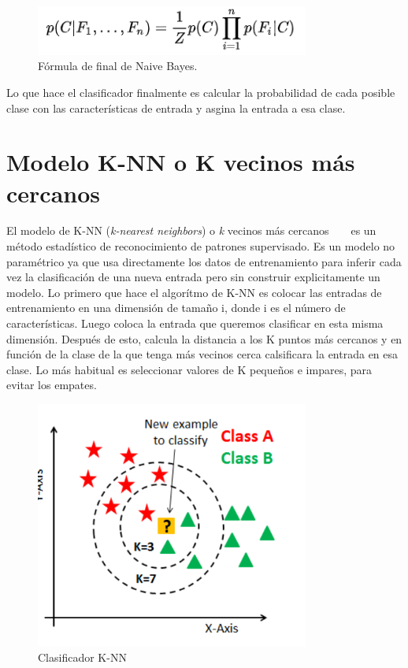 \documentclass[a4paper, 12pt]{book}
\begin{document}
\begin{figure}
	\centering
	\includegraphics[width=9cm, keepaspectratio]{img/ffinalbayes}
	\caption{Fórmula de final de Naive Bayes.}\label{fig:ffinalbayes}
\end{figure}

Lo que hace el clasificador finalmente es calcular la probabilidad de cada posible clase con las características de entrada y asgina la entrada a esa clase.

\section{Modelo K-NN o K vecinos más cercanos} 
\label{sec:modeloknn}

El modelo de K-NN (\emph{k-nearest neighbors}) o \emph{k} vecinos más cercanos ~\cite{knn1} ~\cite{knn2} es un método estadístico de reconocimiento de patrones supervisado. Es un modelo no paramétrico ya que usa directamente los datos de entrenamiento para inferir cada vez la clasificación de una nueva entrada pero sin construir explicitamente un modelo. Lo primero que hace el algorítmo de K-NN es colocar las entradas de entrenamiento en una dimensión de tamaño i, donde i es el número de características. Luego coloca la entrada que queremos clasificar en esta misma dimensión. Después de esto, calcula la distancia a los K puntos más cercanos y en función de la clase de la que tenga más vecinos cerca calsificara la entrada en esa clase. Lo más habitual es seleccionar valores de K pequeños e impares, para evitar los empates. 

\begin{figure}
	\centering
	\includegraphics[width=9cm, keepaspectratio]{img/knn}
	\caption{Clasificador K-NN}\label{fig:knn}
\end{figure}
\end{document}
